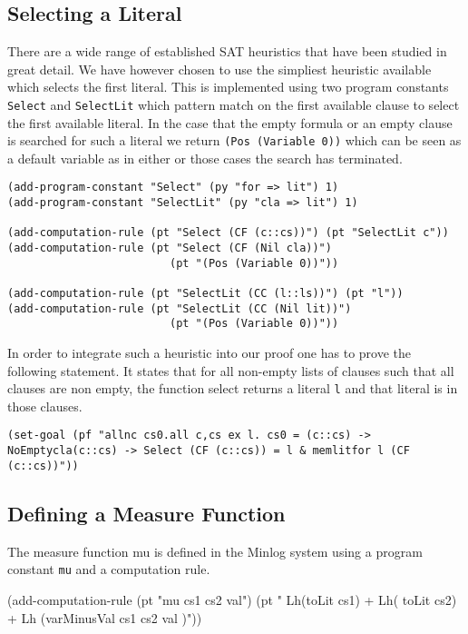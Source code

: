 \subsection*{Selecting a Literal}
There are a wide range of established SAT heuristics that have been studied in great detail. We have however chosen to use the simpliest heuristic available which selects the first literal. This is implemented using two program constants \texttt{Select} and \texttt{SelectLit} which pattern match on the first available clause to select the first available literal. In the case that the empty formula or an empty clause is searched for such a literal we return \texttt{(Pos (Variable 0))} which can be seen as a default variable as in either or those cases the search has terminated. 

\begin{lstlisting}
(add-program-constant "Select" (py "for => lit") 1)
(add-program-constant "SelectLit" (py "cla => lit") 1)

(add-computation-rule (pt "Select (CF (c::cs))") (pt "SelectLit c"))
(add-computation-rule (pt "Select (CF (Nil cla))")  
                         (pt "(Pos (Variable 0))")) 

(add-computation-rule (pt "SelectLit (CC (l::ls))") (pt "l"))
(add-computation-rule (pt "SelectLit (CC (Nil lit))") 
                         (pt "(Pos (Variable 0))"))
\end{lstlisting}

In order to integrate such a heuristic into our proof one has to prove the following statement. It states that for all non-empty lists of clauses such that all clauses are non empty, the function select returns a literal \texttt{l} and that literal is in those clauses.

\begin{center}
\texttt{(set-goal (pf "allnc cs0.all c,cs ex l. cs0 = (c::cs) -> NoEmptycla(c::cs) -> Select (CF (c::cs)) = l \& memlitfor l (CF (c::cs))"))}
\end{center}


\subsection{Defining a Measure Function}
The measure function mu is defined in the Minlog system using a program constant \texttt{mu} and a computation rule.

(add-computation-rule (pt "mu cs1 cs2 val") (pt " Lh(toLit cs1) + Lh( toLit cs2) + Lh (varMinusVal cs1 cs2 val )"))

